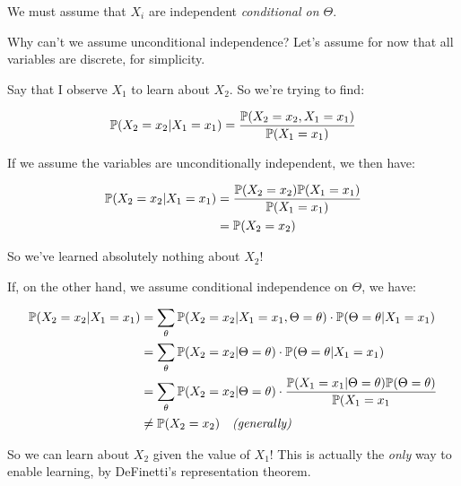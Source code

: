 \documentclass[a4paper]{article}
\begin{document}
                \begin{warn}
                    We must assume that $X_i$ are independent
                    \textit{conditional on $\Theta$}.

                    Why can't we assume unconditional independence? Let's assume
                    for now that all variables are discrete, for simplicity.

                    Say that I observe $X_1$ to learn about $X_2$. So we're
                    trying to find:

                    \[
                        \mathbb{P}(X_2 = x_2 | X_1 = x_1) = \frac{\mathbb{P}(X_2 = x_2,
                        X_1 = x_1)}{\mathbb{P}(X_1 = x_1)}
                    \]

                    If we assume the variables are unconditionally independent,
                    we then have:

                    \begin{align*}
                        \mathbb{P}(X_2 = x_2 | X_1 = x_1) & =
                            \frac{\mathbb{P}(X_2 = x_2)\mathbb{P}(X_1 = x_1)}
                            {\mathbb{P}(X_1 = x_1)} \\
                        & = \mathbb{P}(X_2 = x_2)
                    \end{align*}

                    So we've learned absolutely nothing about $X_2$!

                    If, on the other hand, we assume conditional independence on
                    $\Theta$, we have:

                    \begin{align*}
                        \mathbb{P}(X_2 = x_2 | X_1 = x_1) & = \sum_\theta \mathbb{P}(X_2
                            = x_2 | X_1 = x_1, \Theta = \theta) \cdot
                            \mathbb{P}(\Theta = \theta | X_1 = x_1) \\
                        & = \sum_\theta \mathbb{P}(X_2 = x_2 | \Theta = \theta)
                            \cdot \mathbb{P}(\Theta = \theta | X_1 = x_1) \\
                        & = \sum_\theta \mathbb{P}(X_2 = x_2 | \Theta = \theta)
                            \cdot \frac{\mathbb{P}(X_1 = x_1 | \Theta = \theta)
                            \mathbb{P}(\Theta = \theta)}{\mathbb{P}(X_1 = x_1} \\
                        & \neq \mathbb{P}(X_2 = x_2) \quad \textit{(generally)}
                    \end{align*}

                    So we can learn about $X_2$ given the value of $X_1$! This
                    is actually the \textit{only} way to enable learning, by
                    DeFinetti's representation theorem.
                \end{warn}
\end{document}
